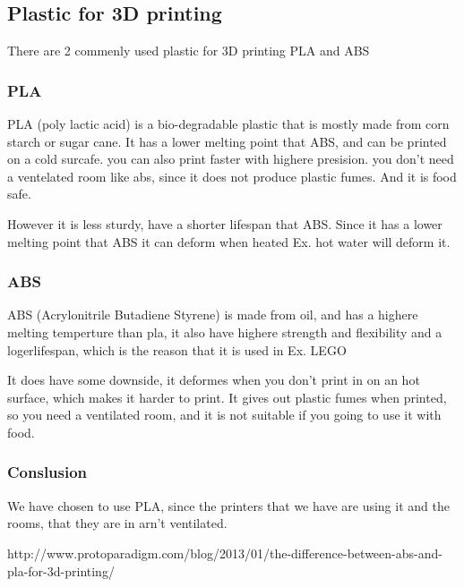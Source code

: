 \subsection{Plastic for 3D printing}
There are 2 commenly used plastic for 3D printing PLA and ABS

\subsubsection{PLA}
PLA (poly lactic acid) is a bio-degradable plastic that is mostly made from corn starch or sugar cane.
It has a lower melting point that ABS, and can be printed on a cold surcafe. you can also print faster with highere presision. you don't need a ventelated room like abs, since it does not produce plastic fumes. And it is food safe.

However it is less sturdy, have a shorter lifespan that ABS. Since it has a lower melting point that ABS it can deform when heated Ex. hot water will deform it.

\subsubsection{ABS}
ABS (Acrylonitrile Butadiene Styrene) is made from oil, and has a highere melting temperture than pla, it also have highere strength and flexibility and a logerlifespan, which is the reason that it is used in Ex. LEGO

It does have some downside, it deformes when you don't print in on an hot surface, which makes it harder to print. It gives out plastic fumes when printed, so you need a ventilated room, and it is not suitable if you going to use it with food.

\subsubsection{Conslusion}
We have chosen to use PLA, since the printers that we have are using it and the rooms, that they are in arn't ventilated.

http://www.protoparadigm.com/blog/2013/01/the-difference-between-abs-and-pla-for-3d-printing/